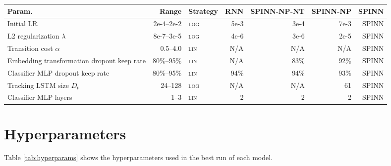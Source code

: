 \documentclass[11pt]{article}
\newcommand\todo[1]{\textcolor{blue}{\textbf{TODO:} #1}}
\newcommand\result[1]{\textcolor{red}{\textbf{RESULT NEEDED:} #1}}
\def\ii#1{\textit{#1}}
\begin{document}
%    
 


 
\begin{table*}[t]\small
\begin{center}
\begin{tabular}{lrlrrrr}
\toprule
Param.     & Range & Strategy        & RNN       & SPINN-NP-NT   & SPINN-NP  & SPINN \\
\midrule 
Initial LR & 2e-4--2e-2 & \textsc{log} & 5e-3  & 3e-4 & 7e-3  & SPINN\\
L2 regularization $\lambda$ & 8e-7--3e-5   & \textsc{log} & 4e-6  & 3e-6   & 2e-5  & SPINN\\
Transition cost $\alpha$  & 0.5--4.0 & \textsc{lin} & N/A & N/A & N/A  & SPINN\\
Embedding transformation dropout keep rate & 80\%--95\% & \textsc{lin} & N/A & 83\% & 92\%  & SPINN\\
Classifier MLP dropout keep rate & 80\%--95\% & \textsc{lin} & 94\%  & 94\%   & 93\%  & SPINN\\
Tracking LSTM size $D_t$ & 24--128 & \textsc{log} & N/A & N/A & 61  & SPINN\\
Classifier MLP layers & 1--3 & \textsc{lin} & 2 & 2 & 2 & SPINN\\
\bottomrule
\end{tabular}
\end{center}
 
\caption{
\label{tab:hyperparams}
Hyperparameter ranges and values. \ii{Range} shows the hyperparameter ranges explored during random search. \ii{Strategy} indicates whether sampling from the range was uniform, or log--uniform. \result{[SB] Full model hyperparams.}
}
\end{table*}

\appendix
\section{Hyperparameters}

Table \ref{tab:hyperparams} shows the hyperparameters used in the best run of each model.
\end{document}
